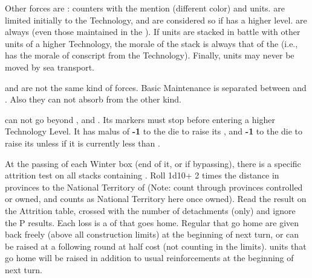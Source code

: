 \bparag[Timars] Other forces are \Timar: counters with the \Timar
mention (different color) and \Pashas units.  \Timar are limited
initially to the \TARQ Technology, and are considered so if \TUR has a
higher level.  \Timar are always  (even those
maintained in the ).  If \Timar units are stacked in
battle with other units of a higher Technology, the morale of the stack
is always that of the \Timar (i.e., has the morale of conscript from the
\Timar Technology).  Finally, \Timar units may never be moved by sea
transport.

\bparag \Janissaire and \Timar are not the same kind of forces.  Basic
Maintenance is separated between \Janissaire and \Timar.  Also they can not
absorb \LD from the other kind.

\label{chSpecific:Turkey:Army Tech}
\TUR can not go beyond  \TMUS, and  \TBAT. Its markers must stop before entering a higher Technology
Level.  It has malus of {\bf -1} to the die to raise its , and {\bf -1} to the die to raise its 
unless if it is currently less than \TARQ.




\label{chSpecific:Turkey:Yearly Campaigning}
At the passing of each Winter box (end of it, or if bypassing), there
is a specific attrition test on all stacks containing \Timar. 
\bparag Roll 1d10+ 2 times the distance in provinces to the National
Territory of \TUR (Note: count through provinces controlled or owned,
 and  counts as National Territory here once
owned).
\bparag Read the result on the Attrition table, crossed with the number
of \Timar detachments (only) and ignore the P results.
\bparag Each loss is a \LD of \Timar that goes home.  Regular \Timar \LD
that go home are given back freely (above all construction limits) at
the beginning of next turn, or can be raised at a following round at
half cost (not counting in the limits).  \Pasha units that go home will
be raised in addition to usual reinforcements at the beginning of next
turn.


